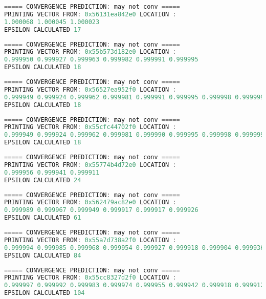 \begin{lstlisting}[language=C,inputencoding=utf8, basicstyle=\fontsize{8}{10}\selectfont,caption=Execution with A5 dimensions: 3x3]
 ===== CONVERGENCE PREDICTION: may not conv =====
PRINTING VECTOR FROM: 0x56131ea842e0 LOCATION :
1.000068 1.000045 1.000023
EPSILON CALCULATED 17
\end{lstlisting}
\begin{lstlisting}[language=C,inputencoding=utf8, basicstyle=\fontsize{8}{10}\selectfont,caption=Execution with A5 dimensions: 6x6]
 ===== CONVERGENCE PREDICTION: may not conv =====
PRINTING VECTOR FROM: 0x55b573d182e0 LOCATION :
0.999950 0.999927 0.999963 0.999982 0.999991 0.999995
EPSILON CALCULATED 18
\end{lstlisting}
\begin{lstlisting}[language=C,inputencoding=utf8, basicstyle=\fontsize{8}{10}\selectfont,caption=Execution with A5 dimensions: 8x8]
 ===== CONVERGENCE PREDICTION: may not conv =====
PRINTING VECTOR FROM: 0x56527ea952f0 LOCATION :
0.999949 0.999924 0.999962 0.999981 0.999991 0.999995 0.999998 0.999999
EPSILON CALCULATED 18
\end{lstlisting}
\begin{lstlisting}[language=C,inputencoding=utf8, basicstyle=\fontsize{6}{8}\selectfont,caption=Execution with A5 dimensions: 10x10]
 ===== CONVERGENCE PREDICTION: may not conv =====
PRINTING VECTOR FROM: 0x55cfc44702f0 LOCATION :
0.999949 0.999924 0.999962 0.999981 0.999990 0.999995 0.999998 0.999999 0.999999 1.000000
EPSILON CALCULATED 18
\end{lstlisting}
\begin{lstlisting}[language=C,inputencoding=utf8, basicstyle=\fontsize{8}{10}\selectfont,caption=Execution with A6 dimensions: 3x3]
 ===== CONVERGENCE PREDICTION: may not conv =====
PRINTING VECTOR FROM: 0x55774b4d72e0 LOCATION :
0.999956 0.999941 0.999911
EPSILON CALCULATED 24                                                                                              
\end{lstlisting}
\begin{lstlisting}[language=C,inputencoding=utf8, basicstyle=\fontsize{8}{10}\selectfont,caption=Execution with A6 dimensions: 6x6]
 ===== CONVERGENCE PREDICTION: may not conv =====
PRINTING VECTOR FROM: 0x562479ac82e0 LOCATION :
0.999989 0.999967 0.999949 0.999917 0.999917 0.999926
EPSILON CALCULATED 61
\end{lstlisting}
\begin{lstlisting}[language=C,inputencoding=utf8, basicstyle=\fontsize{8}{10}\selectfont,caption=Execution with A6 dimensions: 8x8]
 ===== CONVERGENCE PREDICTION: may not conv =====
PRINTING VECTOR FROM: 0x55a7d738a2f0 LOCATION :
0.999994 0.999985 0.999968 0.999954 0.999927 0.999918 0.999904 0.999936
EPSILON CALCULATED 84
\end{lstlisting}
\begin{lstlisting}[language=C,inputencoding=utf8, basicstyle=\fontsize{6}{8}\selectfont,caption=Execution with A6 dimensions: 10x10]
 ===== CONVERGENCE PREDICTION: may not conv =====
PRINTING VECTOR FROM: 0x55cc8327d2f0 LOCATION :
0.999997 0.999992 0.999983 0.999974 0.999955 0.999942 0.999918 0.999912 0.999902 0.999934
EPSILON CALCULATED 104
\end{lstlisting}
